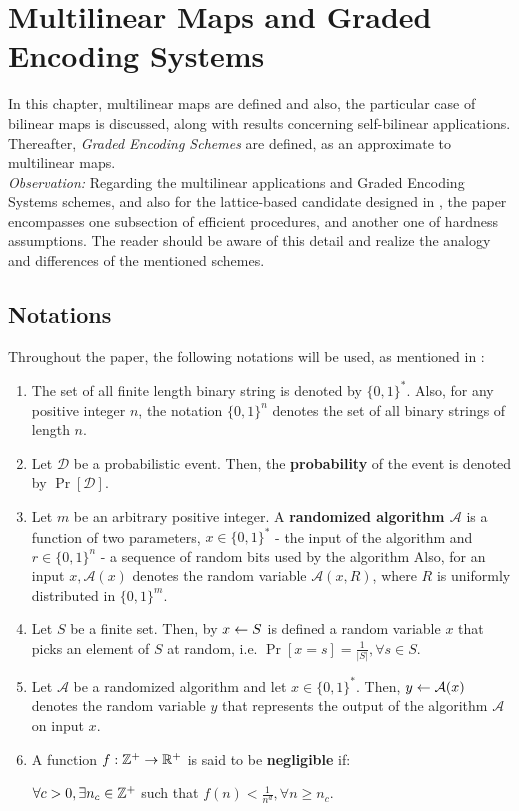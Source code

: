 \chapter{Multilinear Maps and Graded Encoding Systems}

In this chapter, multilinear maps are defined and also, the particular case of bilinear maps is discussed, along with results concerning self-bilinear applications. Thereafter, \textit{Graded Encoding Schemes} are defined, as an approximate to multilinear maps. \\

\textit{Observation:} Regarding the multilinear applications and Graded Encoding Systems schemes, and also for the lattice-based candidate designed in \cite{GGH13}, the paper encompasses one subsection of efficient procedures, and another one of hardness assumptions. The reader should be aware of this detail and realize the analogy and differences of the mentioned schemes.

\section{Notations}
Throughout the paper, the following notations will be used, as mentioned in \cite{BoS02}:

\begin{enumerate}
	\item The set of all finite length binary string is denoted by $\{0, 1\}^*$. Also, for any positive integer $n$, the notation $\{0,1\}^n$ denotes the set of all binary strings of length $n$. 
	
	\item Let $\mathcal{D}$ be a probabilistic event. Then, the \textbf{probability} of the event is denoted by $\Pr[\mathcal{D}]$. 
	
	\item Let $m$ be an arbitrary positive integer. A \textbf{randomized algorithm $\mathcal{A}$} is a function of two parameters, $x \in \{0,1\}^*$ - the input of the algorithm and $r \in \{0, 1\}^n$ - a sequence of random bits used by the algorithm Also, for an input $x, \mathcal{A}(x)$ denotes the random variable $\mathcal{A}(x, R)$, where $R$ is uniformly distributed in $\{0,1\}^m$.
	
	\item Let $S$ be a finite set. Then, by $x \leftarrow S$ is defined a random variable $x$ that picks an element of $S$ at random, i.e. $\Pr[x = s] = \frac{1}{|S|}, \forall s\in S$.
	
	\item Let $\mathcal{A}$ be a randomized algorithm and let $x \in \{0,1\}^*$. Then, $y \leftarrow \mathcal{A} (x)$ denotes the random variable $y$ that represents the output of the algorithm $\mathcal{A}$ on input $x$.
	
	\item A function $f:{\mathbb Z}^+ \rightarrow \mathbb{R}^+$ is said to be \textbf{negligible} if:
	\begin{center}
		$\forall c > 0, \exists n_c \in {\mathbb Z}^+$ such that $f(n) < \frac{1}{n^d}, \forall n \geq n_c$.
	\end{center}
\end{enumerate}

